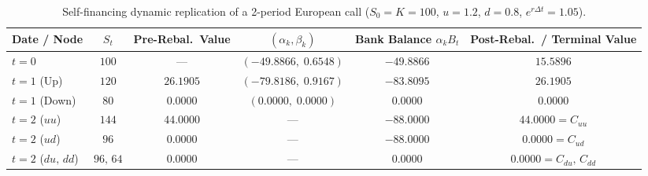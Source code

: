\begin{example}
\begin{table}[!ht]
    \centering
    \caption{Self-financing dynamic replication of a 2-period European call ($S_0 = K = 100$, $u = 1.2$, $d = 0.8$, $e^{r\Delta t} = 1.05$).}
    \label{tab:2p_rebalancing}
    \small
    \setlength{\tabcolsep}{4pt}
    \begin{tabular}{lccccc}
        \toprule
        Date / Node & $S_t$ & Pre-Rebal.\ Value & $(\alpha_k, \beta_k)$ & Bank Balance $\alpha_k B_t$ & Post-Rebal.\ / Terminal Value \\
        \midrule
        $t = 0$ & $100$ & --- & $(-49.8866,\; 0.6548)$ & $-49.8866$ & $15.5896$ \\
        $t = 1$ (Up) & $120$ & $26.1905$ & $(-79.8186,\; 0.9167)$ & $-83.8095$ & $26.1905$ \\
        $t = 1$ (Down) & $80$ & $0.0000$ & $(0.0000,\; 0.0000)$ & $0.0000$ & $0.0000$ \\
        $t = 2$ ($uu$) & $144$ & $44.0000$ & --- & $-88.0000$ & $44.0000 = C_{uu}$ \\
        $t = 2$ ($ud$) & $96$ & $0.0000$ & --- & $-88.0000$ & $0.0000 = C_{ud}$ \\
        $t = 2$ ($du,\, dd$) & $96,\, 64$ & $0.0000$ & --- & $0.0000$ & $0.0000 = C_{du},\, C_{dd}$ \\
        \bottomrule
    \end{tabular}
\end{table}
\end{example}

